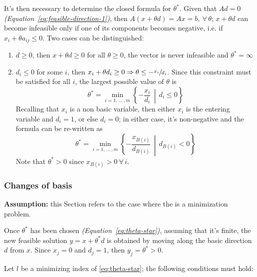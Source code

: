 \documentclass[english]{article}
\begin{document}
\bigskip
It's then necessary to determine the closed formula for \(\theta^\ast\).
Given that \(A d = 0\) \textit{(Equation~\ref{eq:feasible-direction-1})}, then \(A \left( x + \theta d \right) = Ax = b, \ \forall \, \theta\);
\(x + \theta d\) can become infeasible only if one of its components becomes negative, i.e. if \(x_i + \theta a_{ij} \leq 0\).
Two cases can be distinguished:

\begin{enumerate}
  \item \(d \geq 0\), then \(x + \theta d \geq 0\) for all \(\theta \geq 0\), the vector is never infeasible and \(\theta^\ast = \infty\)
  \item \(d_i \leq 0\) for some \(i\), then \(x_i + \theta d_i \geq 0 \Rightarrow \theta \leq -\sfrac{x_i}{d_i}\).
        Since this constraint must be satisfied for all \(i\), the largest possible value of \(\theta\) is
        \begin{equation}
          \theta^\ast = \min_{i=1, \, \ldots \,, m} \left\{ -\dfrac{x_i}{d_i} \,\middle\vert\, d_i \leq 0 \right\}
        \end{equation}
        Recalling that \(x_i\) is a non basic variable, then either \(x_i\) is the entering variable and \(d_i = 1\), or else \(d_i = 0\);
        in either case, it's non-negative and the formula can be re-written as
        \begin{equation}
          \theta^\ast = \min_{i=1, \, \ldots \,, m} \left\{ - \dfrac{x_{B(i)}}{d_{B(i)}} \,\middle\vert\, d_{B(i)} < 0 \right\}
          \label{eq:theta-star}
        \end{equation}
        Note that \(\theta^\ast > 0\) since \(x_{B(i)} > 0 \ \forall \, i\).
\end{enumerate}

\subsubsection{Changes of basis}

\textbf{Assumption:} this Section refers to the case where the \LP is a minimization problem.

\bigskip
Once \(\theta^\ast\) has been chosen \textit{(Equation~\ref{eq:theta-star})}, assuming that it's finite, the new feasible solution \(y= x + \theta^\ast d\) is obtained by moving along the basic direction \(d\) from \(x\).
Since \(x_j=0\) and \(d_j=1\), then \(y_j = \theta^\ast > 0\).

Let \(l\) be a minimizing index of \ref{eq:theta-star};
the following conditions must hold:
\end{document}
